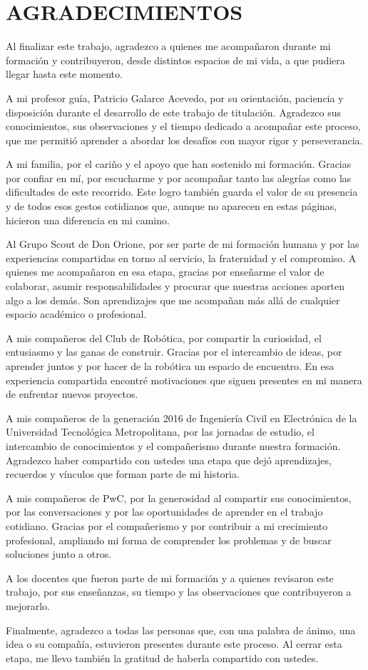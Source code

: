 \chapter*{AGRADECIMIENTOS}
{}
 
Al finalizar este trabajo, agradezco a quienes me acompañaron durante mi formación y contribuyeron, desde distintos espacios de mi vida, a que pudiera llegar hasta este momento.

A mi profesor guía, Patricio Galarce Acevedo, por su orientación, paciencia y disposición durante el desarrollo de este trabajo de titulación. Agradezco sus conocimientos, sus observaciones y el tiempo dedicado a acompañar este proceso, que me permitió aprender a abordar los desafíos con mayor rigor y perseverancia.

A mi familia, por el cariño y el apoyo que han sostenido mi formación. Gracias por confiar en mí, por escucharme y por acompañar tanto las alegrías como las dificultades de este recorrido. Este logro también guarda el valor de su presencia y de todos esos gestos cotidianos que, aunque no aparecen en estas páginas, hicieron una diferencia en mi camino.

Al Grupo Scout de Don Orione, por ser parte de mi formación humana y por las experiencias compartidas en torno al servicio, la fraternidad y el compromiso. A quienes me acompañaron en esa etapa, gracias por enseñarme el valor de colaborar, asumir responsabilidades y procurar que nuestras acciones aporten algo a los demás. Son aprendizajes que me acompañan más allá de cualquier espacio académico o profesional.

A mis compañeros del Club de Robótica, por compartir la curiosidad, el entusiasmo y las ganas de construir. Gracias por el intercambio de ideas, por aprender juntos y por hacer de la robótica un espacio de encuentro. En esa experiencia compartida encontré motivaciones que siguen presentes en mi manera de enfrentar nuevos proyectos.

A mis compañeros de la generación 2016 de Ingeniería Civil en Electrónica de la Universidad Tecnológica Metropolitana, por las jornadas de estudio, el intercambio de conocimientos y el compañerismo durante nuestra formación. Agradezco haber compartido con ustedes una etapa que dejó aprendizajes, recuerdos y vínculos que forman parte de mi historia.

A mis compañeros de PwC, por la generosidad al compartir sus conocimientos, por las conversaciones y por las oportunidades de aprender en el trabajo cotidiano. Gracias por el compañerismo y por contribuir a mi crecimiento profesional, ampliando mi forma de comprender los problemas y de buscar soluciones junto a otros.

A los docentes que fueron parte de mi formación y a quienes revisaron este trabajo, por sus enseñanzas, su tiempo y las observaciones que contribuyeron a mejorarlo.

Finalmente, agradezco a todas las personas que, con una palabra de ánimo, una idea o su compañía, estuvieron presentes durante este proceso. Al cerrar esta etapa, me llevo también la gratitud de haberla compartido con ustedes.